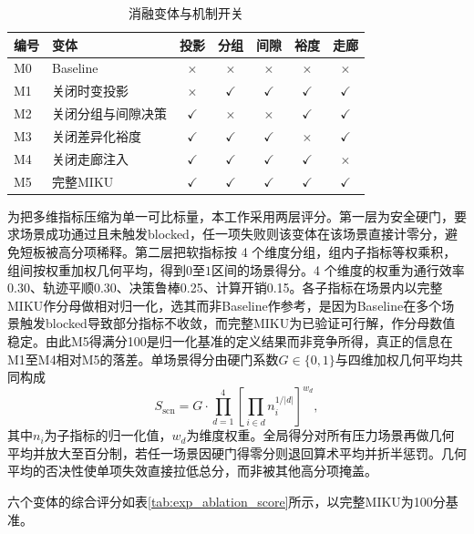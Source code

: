 \documentclass[a4paper,11pt]{ctexart}
\theoremstyle{definition}
\begin{document}
\begin{table}[htbp]
\centering
\caption{消融变体与机制开关}
\label{tab:exp_ablation_matrix}
\small
\begin{tabular}{llccccc}
\toprule
\textbf{编号} & \textbf{变体} & 投影 & 分组 & 间隙 & 裕度 & 走廊 \\
\midrule
M0 & Baseline             & $\times$    & $\times$    & $\times$    & $\times$    & $\times$    \\
M1 & 关闭时变投影         & $\times$    & $\checkmark$ & $\checkmark$ & $\checkmark$ & $\checkmark$ \\
M2 & 关闭分组与间隙决策   & $\checkmark$ & $\times$    & $\times$    & $\checkmark$ & $\checkmark$ \\
M3 & 关闭差异化裕度       & $\checkmark$ & $\checkmark$ & $\checkmark$ & $\times$    & $\checkmark$ \\
M4 & 关闭走廊注入         & $\checkmark$ & $\checkmark$ & $\checkmark$ & $\checkmark$ & $\times$    \\
M5 & 完整MIKU             & $\checkmark$ & $\checkmark$ & $\checkmark$ & $\checkmark$ & $\checkmark$ \\
\bottomrule
\end{tabular}
\end{table}

为把多维指标压缩为单一可比标量，本工作采用两层评分。第一层为安全硬门，要求场景成功通过且未触发blocked，任一项失败则该变体在该场景直接计零分，避免短板被高分项稀释。第二层把软指标按 4 个维度分组，组内子指标等权乘积，组间按权重加权几何平均，得到$0$至$1$区间的场景得分。4 个维度的权重为通行效率0.30、轨迹平顺0.30、决策鲁棒0.25、计算开销0.15。各子指标在场景内以完整MIKU作分母做相对归一化，选其而非Baseline作参考，是因为Baseline在多个场景触发blocked导致部分指标不收敛，而完整MIKU为已验证可行解，作分母数值稳定。由此M5得满分100是归一化基准的定义结果而非竞争所得，真正的信息在M1至M4相对M5的落差。单场景得分由硬门系数$G \in \{0, 1\}$与四维加权几何平均共同构成
\begin{equation}
S_{\mathrm{scn}} = G \cdot \prod_{d=1}^{4} \left[ \prod_{i \in d} n_i^{1/|d|} \right]^{w_d},
\label{eq:exp_score_scn}
\end{equation}
其中$n_i$为子指标的归一化值，$w_d$为维度权重。全局得分对所有压力场景再做几何平均并放大至百分制，若任一场景因硬门得零分则退回算术平均并折半惩罚。几何平均的否决性使单项失效直接拉低总分，而非被其他高分项掩盖。

六个变体的综合评分如表\ref{tab:exp_ablation_score}所示，以完整MIKU为100分基准。
\end{document}
